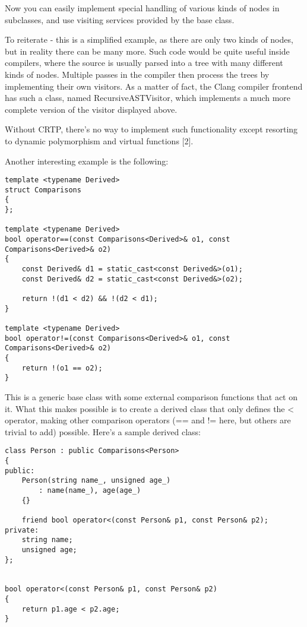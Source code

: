 \documentclass{book}
\begin{document}
Now you can easily implement special handling of various kinds of nodes in subclasses, and use visiting services provided by the base class.

To reiterate - this is a simplified example, as there are only two kinds of nodes, but in reality there can be many more. 
Such code would be quite useful inside compilers, where the source is usually parsed into a tree with many different kinds of nodes. 
Multiple passes in the compiler then process the trees by implementing their own visitors. 
As a matter of fact, the Clang compiler frontend has such a class, named RecursiveASTVisitor, which implements a much more complete version of the visitor displayed above.

Without CRTP, there's no way to implement such functionality except resorting to dynamic polymorphism and virtual functions [2].

Another interesting example is the following:

\begin{lstlisting}
template <typename Derived>
struct Comparisons
{
};

template <typename Derived>
bool operator==(const Comparisons<Derived>& o1, const Comparisons<Derived>& o2)
{
    const Derived& d1 = static_cast<const Derived&>(o1);
    const Derived& d2 = static_cast<const Derived&>(o2);

    return !(d1 < d2) && !(d2 < d1);
}

template <typename Derived>
bool operator!=(const Comparisons<Derived>& o1, const Comparisons<Derived>& o2)
{
    return !(o1 == o2);
}
\end{lstlisting}

This is a generic base class with some external comparison functions that act on it. 
What this makes possible is to create a derived class that only defines the < operator, making other comparison operators (== and != here, but others are trivial to add) possible.
Here's a sample derived class:

\begin{lstlisting}
class Person : public Comparisons<Person>
{
public:
    Person(string name_, unsigned age_)
        : name(name_), age(age_)
    {}

    friend bool operator<(const Person& p1, const Person& p2);
private:
    string name;
    unsigned age;
};


bool operator<(const Person& p1, const Person& p2)
{
    return p1.age < p2.age;
}
\end{lstlisting}
\end{document}
